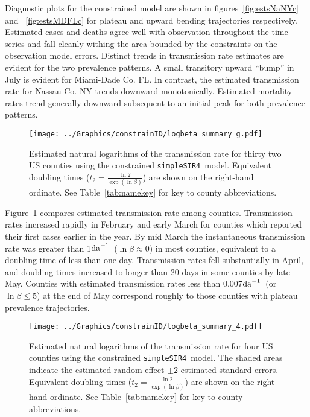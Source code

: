 \documentclass[12pt,letterpaper]{article}
\newcommand\perda{$\rm{da}^{-1}$}
\newcommand\SSm{{\tt simpleSIR4}}
\begin{document}
{Diagnostic plots for the constrained model are shown in
figures~\ref{fig:estsNaNYc} and~ \ref{fig:estsMDFLc}
for plateau and upward  bending trajectories respectively.
Estimated cases and deaths agree well with observation throughout the
time series and fall cleanly withing the area bounded by the
constraints on the observation model errors.
Distinct trends in transmission rate estimates are evident for
the two prevalence patterns. A small transitory upward ``bump'' in July is
evident for Miami-Dade Co. FL.
In contrast, the estimated transmission rate for Nassau Co. NY trends
downward monotonically. 
Estimated mortality rates trend generally downward subsequent to an
initial peak for both prevalence patterns.

\begin{figure}[!h]
\begin{center}
\texttt{[image: ../Graphics/constrainID/logbeta\_summary\_g.pdf]}\\
\end{center}
\caption{\label{fig:xrates}
Estimated natural logarithms of the transmission rate for thirty two US
counties using the constrained \SSm\ model.
Equivalent doubling times ($t_2 = \frac{\ln 2}{\exp(\ln \beta)}$)
are shown on the right-hand ordinate.
See Table~\ref{tab:namekey} for key to county abbreviations.
}
\end{figure}

Figure~\ref{fig:xrates} compares estimated transmission rate among
counties.
Transmission rates increased rapidly in February and early March for
counties which reported their first cases earlier in the year.
By mid March the instantaneous transmission rate
was greater than 1\perda\ ($\ln \beta \approx 0$) in most counties,
equivalent to a doubling time of less than one day.
Transmission rates fell substantially in April, and doubling times
increased to longer than 20 days in some counties by late May.
Counties with estimated transmission rates less than 0.007\perda\ 
(or $\ln \beta \le 5$) at the end of May
correspond roughly to those counties with plateau prevalence
trajectories.

\begin{figure}[!h]
\begin{center}
\texttt{[image: ../Graphics/constrainID/logbeta\_summary\_4.pdf]}\\
\end{center}
\caption{\label{fig:xrates2}
Estimated natural logarithms of the transmission rate for four US
counties using the constrained \SSm\ model.
The shaded areas indicate the estimated random effect $\pm 2$
estimated standard errors.
Equivalent doubling times ($t_2 = \frac{\ln 2}{\exp(\ln \beta)}$)
are shown on the right-hand ordinate.
See Table~\ref{tab:namekey} for key to county abbreviations.
}
\end{figure}

}
\end{document}
